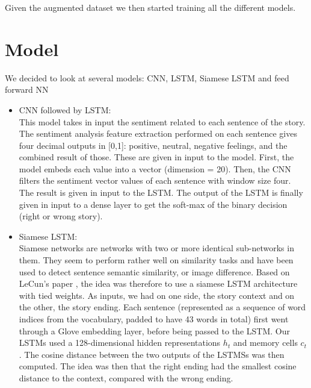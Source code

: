 \documentclass{article}
\begin{document}
Given the augmented dataset we then started training all the different models.

\section{Model}

We decided to look at several models: CNN, LSTM, Siamese LSTM and feed forward NN
\begin{itemize}
\item CNN followed by LSTM:\\ This model takes in input the sentiment related to each sentence of the story. The sentiment analysis feature extraction performed on each sentence gives four decimal outputs in [0,1]: positive, neutral, negative feelings, and the combined result of those. These are given in input to the model. First, the model embeds each value into a vector (dimension = 20). Then, the CNN filters the sentiment vector values of each sentence with window size four. The result is given in input to the LSTM. The output of the LSTM is finally given in input to a dense layer to get the soft-max of the binary decision (right or wrong story).

\item Siamese LSTM: \\
Siamese networks are networks with two or more identical sub-networks in them. They seem to perform rather well on similarity tasks and have been used to detect sentence semantic similarity, or image difference.
Based on LeCun's paper \citep{LeCun Siamese}, the idea was therefore to use a siamese LSTM architecture with tied weights. As inputs, we had on one side, the story context and on the other, the story ending. Each sentence (represented as a sequence of word indices from the vocabulary, padded to have 43 words in total) first went through a Glove embedding layer, before being passed to the LSTM. Our LSTMs used a 128-dimensional hidden representations $h_t$ and memory cells $c_t$. The cosine distance between the two outputs of the LSTMSs was then computed. The idea was then that the right ending had the smallest cosine distance to the context, compared with the wrong ending.


\end{itemize}
\end{document}
